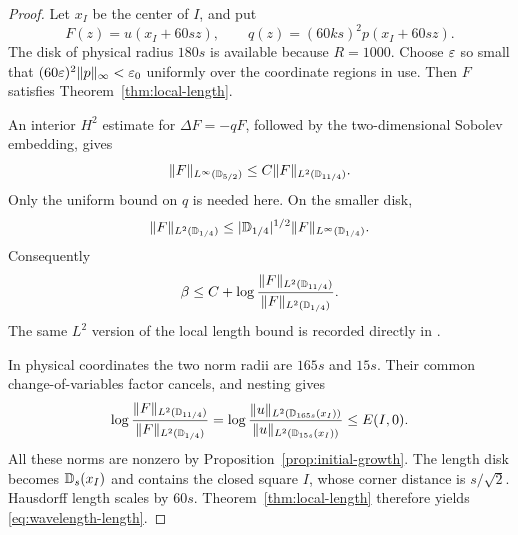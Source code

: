 \begin{proof}
Let $x_I$ be the center of $I$, and put
\[
 F(z)=u(x_I+60sz),\qquad q(z)=(60ks)^2p(x_I+60sz).
\]
The disk of physical radius $180s$ is available because $R=1000$.
Choose $\varepsilon$ so small that
$(60\varepsilon)^2\lVert p\rVert_\infty<\varepsilon_0$ uniformly over the coordinate
regions in use. Then $F$ satisfies Theorem~\ref{thm:local-length}.

An interior $H^2$ estimate for $\Delta F=-qF$, followed by the
two-dimensional Sobolev embedding, gives
\[
 \lVert F\rVert_{L^\infty(\mathbb D_{5/2})}
 \le C\lVert F\rVert_{L^2(\mathbb D_{11/4})}.
\]
Only the uniform bound on $q$ is needed here. On the smaller disk,
\[
 \lVert F\rVert_{L^2(\mathbb D_{1/4})}\le
 |\mathbb D_{1/4}|^{1/2}\lVert F\rVert_{L^\infty(\mathbb D_{1/4})}.
\]
Consequently
\[
 \beta\le C+
 \log\frac{\lVert F\rVert_{L^2(\mathbb D_{11/4})}}
               {\lVert F\rVert_{L^2(\mathbb D_{1/4})}}.
\]
The same $L^2$ version of the local length bound is recorded directly
in \cite[Theorem~3.1.1]{RoyFortinLq}.

In physical coordinates the two norm radii are $165s$ and $15s$.
Their common change-of-variables factor cancels, and nesting gives
\[
 \log\frac{\lVert F\rVert_{L^2(\mathbb D_{11/4})}}
               {\lVert F\rVert_{L^2(\mathbb D_{1/4})}}
 =\log\frac{\lVert u\rVert_{L^2(\mathbb D_{165s}(x_I))}}
                {\lVert u\rVert_{L^2(\mathbb D_{15s}(x_I))}}
 \le E(I,0).
\]
All these norms are nonzero by Proposition~\ref{prop:initial-growth}.
The length disk becomes $\mathbb D_s(x_I)$ and contains the closed square
$I$, whose corner distance is $s/\sqrt2$. Hausdorff length scales
by $60s$. Theorem~\ref{thm:local-length} therefore yields
\eqref{eq:wavelength-length}.
\end{proof}

